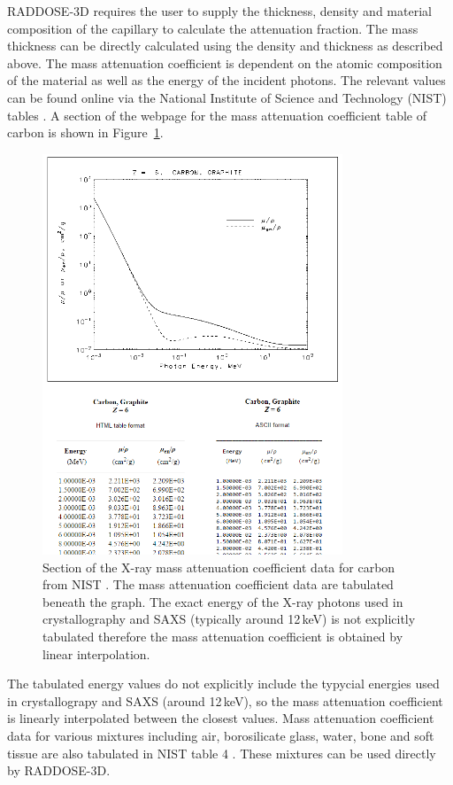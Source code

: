 RADDOSE-3D requires the user to supply the thickness, density and material composition of the capillary to calculate the attenuation fraction.
The mass thickness can be directly calculated using the density and thickness as described above.
The mass attenuation coefficient is dependent on the atomic composition of the material as well as the energy of the incident photons.
The relevant values can be found online via the National Institute of Science and Technology (NIST) tables \cite{nisttable3,nisttable4}.
A section of the webpage for the mass attenuation coefficient table of carbon is shown in Figure~\ref{fig:NIST table for carbon}.
\begin{figure}
    \centering
    \includegraphics[width=0.8\textwidth]{figures/saxs/nist_table_carbon.png}
    \caption[X-ray mass attenuation coefficient data for carbon from NIST.]{Section of the X-ray mass attenuation coefficient data for carbon from NIST \cite{nisttable3}. The mass attenuation coefficient data are tabulated beneath the graph. The exact energy of the X-ray photons used in crystallography and SAXS (typically around 12\,keV) is not explicitly tabulated therefore the mass attenuation coefficient is obtained by linear interpolation.}
    \label{fig:NIST table for carbon}
\end{figure}
The tabulated energy values do not explicitly include the typycial energies used in crystallograpy and SAXS (around 12\,keV), so the mass attenuation coefficient is linearly interpolated between the closest values.
Mass attenuation coefficient data for various mixtures including air, borosilicate glass, water, bone and soft tissue are also tabulated in NIST table 4 \cite{nisttable4}.
These mixtures can be used directly by RADDOSE-3D.

